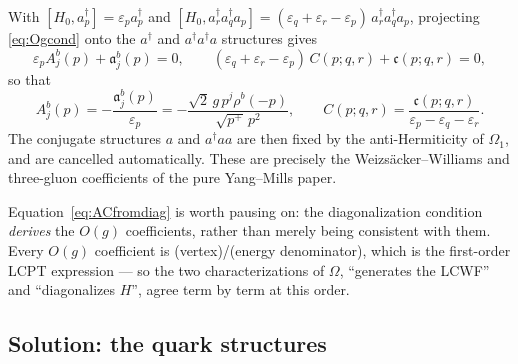 \documentclass[11pt]{article}
\newcommand{\eps}{\varepsilon}
\newcommand{\dg}{\dagger}
\newcommand{\OM}{\Omega}
\begin{document}
With $[H_{0},a^{\dg}_{p}]=\eps_{p}a^{\dg}_{p}$ and
$[H_{0},a^{\dg}_{r}a^{\dg}_{q}a_{p}]=(\eps_{q}+\eps_{r}-\eps_{p})\,a^{\dg}_{r}a^{\dg}_{q}a_{p}$,
projecting \eqref{eq:Ogcond} onto the $a^{\dg}$ and $a^{\dg}a^{\dg}a$ structures gives
\begin{equation}
\eps_{p}A^{b}_{j}(p)+\mathfrak a^{b}_{j}(p)=0,
\qquad
(\eps_{q}+\eps_{r}-\eps_{p})\,C(p;q,r)+\mathfrak c(p;q,r)=0,
\end{equation}
so that
\begin{equation}
A^{b}_{j}(p)=-\frac{\mathfrak a^{b}_{j}(p)}{\eps_{p}}
=-\frac{\sqrt2\,g\,p^{j}\rho^{b}(-p)}{\sqrt{p^{+}}\,p^{2}},
\qquad
C(p;q,r)=\frac{\mathfrak c(p;q,r)}{\eps_{p}-\eps_{q}-\eps_{r}} .
\label{eq:ACfromdiag}
\end{equation}
The conjugate structures $a$ and $a^{\dg}aa$ are then fixed by the anti-Hermiticity of
$\OM_{1}$, and are cancelled automatically. These are precisely the Weizs\"acker--Williams and
three-gluon coefficients of the pure Yang--Mills paper.

\begin{res}
Equation~\eqref{eq:ACfromdiag} is worth pausing on: the diagonalization condition
\emph{derives} the $O(g)$ coefficients, rather than merely being consistent with them. Every
$O(g)$ coefficient is (vertex)/(energy denominator), which is the first-order LCPT expression ---
so the two characterizations of $\OM$, ``generates the LCWF'' and ``diagonalizes $H$'', agree
term by term at this order.
\end{res}

\subsection{Solution: the quark structures}
\end{document}
